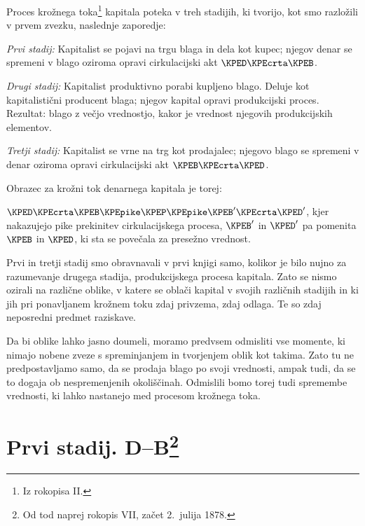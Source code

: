 \documentclass[kapital_02.tex]{subfiles}
\begin{document}
Proces \KPEstran krožnega toka\footnote{Iz rokopisa II.} kapitala poteka v treh stadijih, ki tvorijo, kot smo razložili v prvem zvezku, naslednje zaporedje:

\emph{Prvi stadij:} Kapitalist se pojavi na trgu blaga in dela kot kupec; njegov denar se spremeni v blago oziroma opravi cirkulacijski akt \(\KPED\KPEcrta\KPEB\).

\emph{Drugi stadij:} Kapitalist produktivno porabi kupljeno blago. Deluje kot kapitalistični producent blaga; njegov kapital opravi produkcijski proces. Rezultat: blago z večjo vrednostjo, kakor je vrednost njegovih produkcijskih elementov.

\emph{Tretji stadij:} Kapitalist se vrne na trg kot prodajalec; njegovo blago se spremeni v denar oziroma opravi cirkulacijski akt \(\KPEB\KPEcrta\KPED\).

Obrazec za krožni tok denarnega kapitala je torej:

\(\KPED\KPEcrta\KPEB\KPEpike\KPEP\KPEpike\KPEB'\KPEcrta\KPED'\), kjer nakazujejo pike prekinitev cirkulacijskega procesa, \(\KPEB'\) in \(\KPED'\) pa pomenita \(\KPEB\) in \(\KPED\), ki sta se povečala za presežno vrednost.

Prvi \KPEstran in tretji stadij smo obravnavali v prvi knjigi samo, kolikor je bilo nujno za razumevanje drugega stadija, produkcijskega procesa kapitala. Zato se nismo ozirali na različne oblike, v katere se oblači kapital v svojih različnih stadijih in ki jih pri ponavljanem krožnem toku zdaj privzema, zdaj odlaga. Te so zdaj neposredni predmet raziskave.

Da bi oblike lahko jasno doumeli, moramo predvsem odmisliti vse momente, ki nimajo nobene zveze s spreminjanjem in tvorjenjem oblik kot takima. Zato tu ne predpostavljamo samo, da se prodaja blago po svoji vrednosti, ampak tudi, da se to dogaja ob nespremenjenih okoliščinah. Odmislili bomo torej tudi spremembe vrednosti, ki lahko nastanejo med procesom krožnega toka.

\section{Prvi stadij. D--B\footnote{Od tod naprej rokopis VII, začet 2.\ julija 1878.}}
\end{document}
